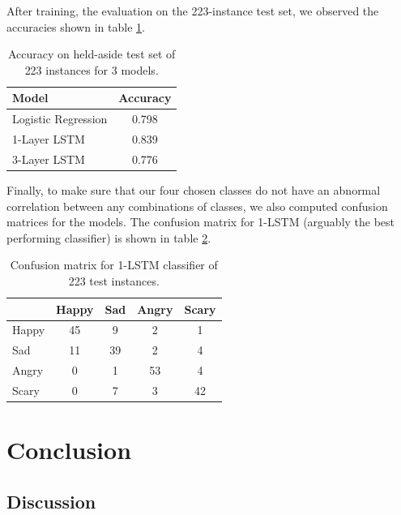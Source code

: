 \documentclass{article}
\begin{document}
After training, the evaluation on the 223-instance test set, we observed the accuracies shown in table \ref{tbl:baseline_acc}.
\begin{table}[!htb] 
\caption{Accuracy on held-aside test set of 223 instances for 3 models.}
\label{tbl:baseline_acc}
\centering
\begin{tabular}{lc} 
\toprule
\hline
Model & Accuracy \\ 
\midrule
Logistic Regression & 0.798 \\
1-Layer LSTM & 0.839 \\ 
3-Layer LSTM & 0.776 \\ 
\bottomrule
\end{tabular}
\end{table}

Finally, to make sure that our four chosen classes do not have an abnormal correlation between any combinations of classes, we also computed confusion matrices for the models. The confusion matrix for 1-LSTM (arguably the best performing classifier) is shown in table \ref{tbl:baseline_conf}.

\begin{table}[!htb] 
\caption{Confusion matrix for 1-LSTM classifier of 223 test instances.}
\label{tbl:baseline_conf}
\centering
\begin{tabular}{lcccc} 
\toprule
\hline
 & Happy & Sad & Angry & Scary \\ 
\midrule
Happy & 45 &  9 & 2 & 1 \\
Sad   &  11 & 39 & 2 & 4 \\
Angry &  0 &  1 & 53 & 4 \\
Scary &  0 &  7 & 3 &  42 \\
\bottomrule
\end{tabular}
\end{table}

\section{Conclusion}

\subsection{Discussion}
\end{document}
